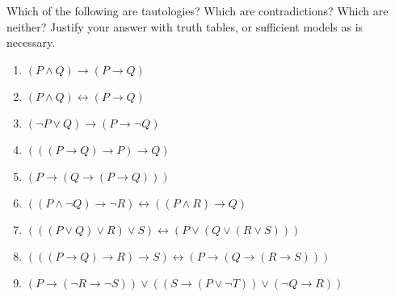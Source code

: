 \documentclass[12pt]{article}
\newenvironment{problem}[2][Problem]{\begin{trivlist}
\item[\hskip \labelsep {\bfseries #1}\hskip \labelsep {\bfseries #2.}]}{\end{trivlist}}
\begin{document}
\vskip 0.5in
\newpage
\begin{problem}{2}
Which of the following are tautologies?  Which are contradictions?  Which are neither?  Justify your answer with truth tables, or sufficient models as is necessary.
\begin{enumerate}
  \parskip=0in
  \parsep=0in
  \itemsep=0in
\item $(P \wedge Q) \rightarrow (P \rightarrow Q)$
\item $(P \wedge Q) \leftrightarrow (P \rightarrow Q)$
\item $(\lnot P \vee Q) \rightarrow (P \rightarrow \lnot Q)$
\item $(((P \rightarrow Q) \rightarrow P) \rightarrow Q)$
\item $(P \rightarrow (Q \rightarrow (P \rightarrow Q)))$
\item $((P \wedge \lnot Q) \rightarrow \lnot R) \leftrightarrow ((P \wedge R) \rightarrow Q)$
\item $(((P \vee Q) \vee R) \vee S) \leftrightarrow (P \vee (Q \vee (R \vee S)))$
\item $(((P \rightarrow Q) \rightarrow R) \rightarrow S) \leftrightarrow (P \rightarrow (Q \rightarrow (R \rightarrow S)))$
\item $(P \rightarrow (\lnot R \rightarrow \lnot S)) \vee ((S \rightarrow (P \vee \lnot T)) \vee (\lnot Q \rightarrow R))$
\end{enumerate}
\end{problem}
\end{document}
